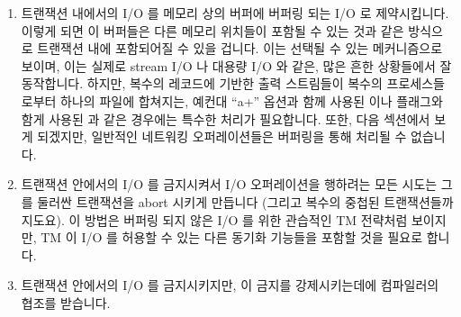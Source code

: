 \begin{enumerate}
\item	트랜잭션 내에서의 I/O 를 메모리 상의 버퍼에 버퍼링 되는 I/O 로
	제약시킵니다.
	이렇게 되면 이 버퍼들은 다른 메모리 위치들이 포함될 수 있는 것과 같은
	방식으로 트랜잭션 내에 포함되어질 수 있을 겁니다.
	이는 선택될 수 있는 메커니즘으로 보이며, 이는 실제로 stream I/O 나
	대용량 I/O 와 같은, 많은 흔한 상황들에서 잘 동작합니다.
	하지만, 복수의 레코드에 기반한 출력 스트림들이 복수의 프로세스들로부터
	하나의 파일에 합쳐지는, 예컨대 ``a+'' 옵션과 함께 사용된 
	이나  플래그와 함게 사용된  과 같은 경우에는
	특수한 처리가 필요합니다.
	또한, 다음 섹션에서 보게 되겠지만, 일반적인 네트워킹 오퍼레이션들은
	버퍼링을 통해 처리될 수 없습니다.

\item	트랜잭션 안에서의 I/O 를 금지시켜서 I/O 오퍼레이션을 행하려는 모든
	시도는 그를 둘러싼 트랜잭션을 abort 시키게 만듭니다 (그리고 복수의
	중첩된 트랜잭션들까지도요).
	이 방법은 버퍼링 되지 않은 I/O 를 위한 관습적인 TM 전략처럼 보이지만,
	TM 이 I/O 를 허용할 수 있는 다른 동기화 기능들을 포함할 것을 필요로
	합니다.
\item	트랜잭션 안에서의 I/O 를 금지시키지만, 이 금지를 강제시키는데에
	컴파일러의 협조를 받습니다.
\iffalse


\end{enumerate}
